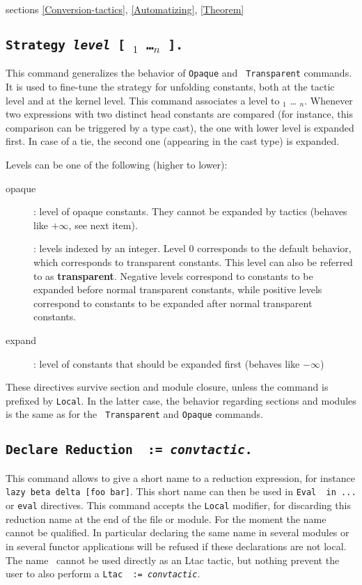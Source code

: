 \SeeAlso sections \ref{Conversion-tactics}, \ref{Automatizing},
\ref{Theorem}

\subsection{\tt Strategy {\it level} [ \qualid$_1$ \dots \qualid$_n$
  ].\label{Strategy}}
This command generalizes the behavior of {\tt Opaque} and {\tt
  Transparent} commands. It is used to fine-tune the strategy for
unfolding constants, both at the tactic level and at the kernel
level. This command associates a level to \qualid$_1$ \dots
\qualid$_n$. Whenever two expressions with two distinct head
constants are compared (for instance, this comparison can be triggered
by a type cast), the one with lower level is expanded first. In case
of a tie, the second one (appearing in the cast type) is expanded.

Levels can be one of the following (higher to lower):
\begin{description}
\item[opaque]: level of opaque constants. They cannot be expanded by
  tactics (behaves like $+\infty$, see next item).
\item[\num]: levels indexed by an integer. Level $0$ corresponds
  to the default behavior, which corresponds to transparent
  constants. This level can also be referred to as {\bf transparent}.
  Negative levels correspond to constants to be expanded before normal
  transparent constants, while positive levels correspond to constants
  to be expanded after normal transparent constants.
\item[expand]: level of constants that should be expanded first
  (behaves like $-\infty$)
\end{description}

These directives survive section and module closure, unless the
command is prefixed by {\tt Local}. In the latter case, the behavior
regarding sections and modules is the same as for the {\tt
  Transparent} and {\tt Opaque} commands.

\subsection{\tt Declare Reduction \ident\ := {\rm\sl convtactic}.}

This command allows to give a short name to a reduction expression,
for instance {\tt lazy beta delta [foo bar]}. This short name can
then be used in {\tt Eval \ident\ in ...} or {\tt eval} directives.
This command accepts the {\tt Local} modifier, for discarding
this reduction name at the end of the file or module. For the moment
the name cannot be qualified. In particular declaring the same name
in several modules or in several functor applications will be refused
if these declarations are not local. The name \ident\ cannot be used
directly as an Ltac tactic, but nothing prevent the user to also
perform a {\tt Ltac \ident\ := {\rm\sl convtactic}}.

